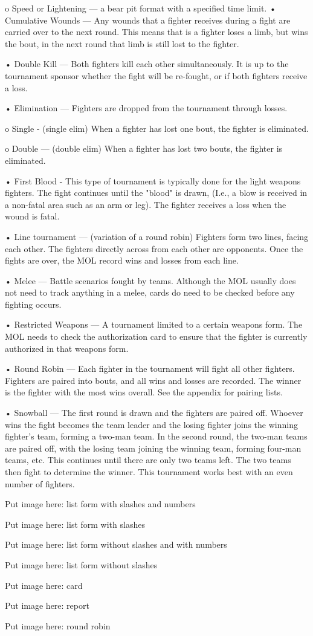 \documentclass{article}
\begin{document}
o Speed or Lightening --- a bear pit format with a specified time limit.
• Cumulative Wounds --- Any wounds that a fighter receives during a fight are carried over to the next
round. This means that is a fighter loses a limb, but wins the bout, in the next round that limb is still
lost to the fighter.

• Double Kill --- Both fighters kill each other simultaneously. It is up to the tournament sponsor whether
the fight will be re-fought, or if both fighters receive a loss.

• Elimination --- Fighters are dropped from the tournament through losses.

o Single - (single elim) When a fighter has lost one bout, the fighter is eliminated.

o Double --- (double elim) When a fighter has lost two bouts, the fighter is eliminated.

• First Blood - This type of tournament is typically done for the light weapons fighters. The fight
continues until the "blood" is drawn, (I.e., a blow is received in a non-fatal area such as an arm or leg).
The fighter receives a loss when the wound is fatal.

• Line tournament --- (variation of a round robin) Fighters form two lines, facing each other. The
fighters directly across from each other are opponents. Once the fights are over, the MOL record wins
and losses from each line.

• Melee --- Battle scenarios fought by teams. Although the MOL usually does not need to track anything
in a melee, cards do need to be checked before any fighting occurs.

• Restricted Weapons --- A tournament limited to a certain weapons form. The MOL needs to check the
authorization card to ensure that the fighter is currently authorized in that weapons form.

• Round Robin --- Each fighter in the tournament will fight all other fighters. Fighters are paired into
bouts, and all wins and losses are recorded. The winner is the fighter with the most wins overall. See
the appendix for pairing lists.

• Snowball --- The first round is drawn and the fighters are paired off. Whoever wins the fight becomes
the team leader and the losing fighter joins the winning fighter’s team, forming a two-man team. In the
second round, the two-man teams are paired off, with the losing team joining the winning team,
forming four-man teams, etc. This continues until there are only two teams left. The two teams then
fight to determine the winner. This tournament works best with an even number of fighters.

Put image here: list form with slashes and numbers

Put image here: list form with slashes


Put image here: list form without slashes and with numbers

Put image here: list form without slashes

Put image here: card

Put image here: report

Put image here: round robin
\end{document}
